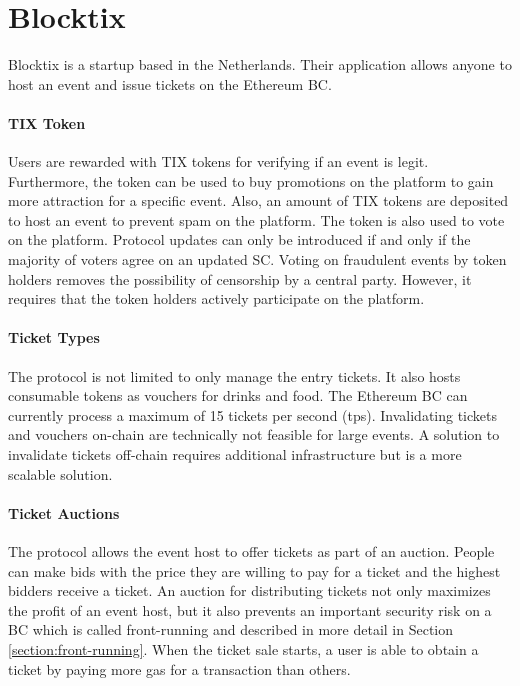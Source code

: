 
\section{Blocktix}\label{section:blocktix}

Blocktix \cite{blocktix-whitepaper} is a startup based in the Netherlands. Their application allows anyone to host an event and issue tickets on the Ethereum BC. 

\paragraph{TIX Token}
Users are rewarded with TIX tokens for verifying if an event is legit. Furthermore, the token can be used to buy promotions on the platform to gain more attraction for a specific event. Also, an amount of TIX tokens are deposited to host an event to prevent spam on the platform. The token is also used to vote on the platform. Protocol updates can only be introduced if and only if the majority of voters agree on an updated SC. 
Voting on fraudulent events by token holders removes the possibility of censorship by a central party. However, it requires that the token holders actively participate on the platform. 

\paragraph{Ticket Types}
The protocol is not limited to only manage the entry tickets. It also hosts consumable tokens as vouchers for drinks and food. 
The Ethereum BC can currently process a maximum of 15 tickets per second (tps). Invalidating tickets and vouchers on-chain are technically not feasible for large events. A solution to invalidate tickets off-chain requires additional infrastructure but is a more scalable solution. 

\paragraph{Ticket Auctions}
The protocol allows the event host to offer tickets as part of an auction. People can make bids with the price they are willing to pay for a ticket and the highest bidders receive a ticket. 
An auction for distributing tickets not only maximizes the profit of an event host, but it also prevents an important security risk on a BC which is called front-running and described in more detail in Section \ref{section:front-running}. When the ticket sale starts, a user is able to obtain a ticket by paying more gas for a transaction than others. 

